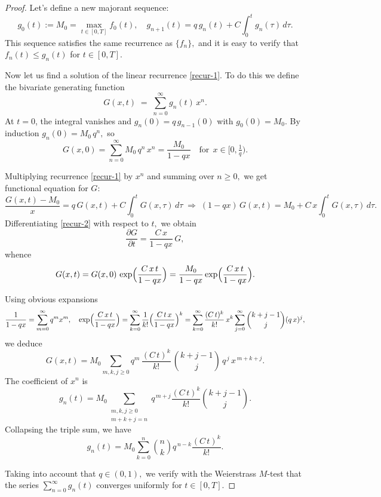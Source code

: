 \documentclass[10pt,a4paper]{amsart}
\begin{document}
	\begin{proof} 
		Let’s define a new majorant sequence:
		\begin{equation}\label{recur-1}
			g_0(t) := M_0 = \max_{t \in [0,T]} f_0(t), \quad
			g_{n+1}(t) = q\,  g_n(t) + C \int_0^t g_n(\tau)\, d\tau.
		\end{equation}
		This sequence satisfies the same recurrence as $\{f_n\},$ and it is easy to verify that
		$f_n(t) \le g_n(t)$ for $t\in [0,T].$
		
		Now let us find a solution of  the linear recurrence \eqref{recur-1}. To do this we define the bivariate generating function
		\[
		G(x,t)\;=\;\sum_{n=0}^{\infty}g_{n}(t)\,x^{n}.
		\]
		At \(t=0\), the integral vanishes and \(g_{n}(0)=q\,g_{n-1}(0)\) with \(g_{0}(0)=M_{0}\).  By induction
		$g_{n}(0)=M_{0}\,q^{n},$
		so
		\[
		G(x,0)
		=\sum_{n=0}^{\infty}M_{0}\,q^{n}\,x^{n}
		=\frac{M_{0}}{1-qx} \quad \text{for} \ \ x \in [0, \tfrac{1}{q}).
		\]
		
		Multiplying recurrence \eqref{recur-1} by $x^{n}$ and summing over $n\ge0,$ we get
		functional equation for $G$:
		\begin{equation}\label{recur-2}
			\frac{G(x,t)-M_{0}}{x}
			=q\,G(x,t)
			+ C\int_{0}^{t}G(x,\tau)\,d\tau
			\;\Longrightarrow\;
			(1-qx)\,G(x,t)
			= M_{0} + C\,x\int_{0}^{t}G(x,\tau)\,d\tau.
		\end{equation}
		Differentiating \eqref{recur-2} with respect to $t,$ we obtain 
		\[
		\frac{\partial G}{\partial t}
		= \frac{C\,x}{1-qx}\,G,
		\]
		whence 
		\[
		G(x,t)
		=G(x,0)\,
		\exp\Bigl(\frac{C\,x\,t}{1-qx}\Bigr)
		=\frac{M_{0}}{1-qx}
		\exp\Bigl(\frac{C\,x\,t}{1-qx}\Bigr).
		\]
		
		Using obvious expansions
		\[
		\frac{1}{1-qx}
		=\sum_{m=0}^{\infty}q^{m}x^{m},
		\quad
		\exp\Bigl(\frac{C\,x\,t}{1-qx}\Bigr)
		=\sum_{k=0}^{\infty}\frac{1}{k!}
		\Bigl(\frac{C\,t\,x}{1-qx}\Bigr)^{k}
		=\sum_{k=0}^{\infty}\frac{(C\,t)^{k}}{k!}\,x^{k}
		\sum_{j=0}^{\infty}\binom{k+j-1}{j}(q\,x)^{j},
		\]
		we deduce
		\[
		G(x,t)
		=M_{0}
		\sum_{m,k,j\ge0}
		q^{m}\,
		\frac{(C\,t)^{k}}{k!}\,
		\binom{k+j-1}{j}\,
		q^{\,j}\,
		x^{\,m+k+j}.
		\]
		The coefficient of $x^{n}$ is
		\[
		g_{n}(t)
		= M_{0}
		\sum_{\substack{m,k,j\ge0\\m+k+j=n}}
		q^{\,m+j}
		\frac{(C\,t)^{k}}{k!}
		\binom{k+j-1}{j}.
		\]
		Collapsing  the triple sum, we have
		\[
		g_{n}(t)
		= M_{0}
		\sum_{k=0}^{n}
		\binom{n}{k}
		q^{\,n-k}
		\frac{(C\,t)^{k}}{k!}.
		\]
		
		Taking into account that $q \in (0, 1),$ we verify with the  Weierstrass $M$-test that the series $\sum_{n=0}^{\infty} g_n(t) $
		converges uniformly for $t\in[0,T].$
	\end{proof}
\end{document}
